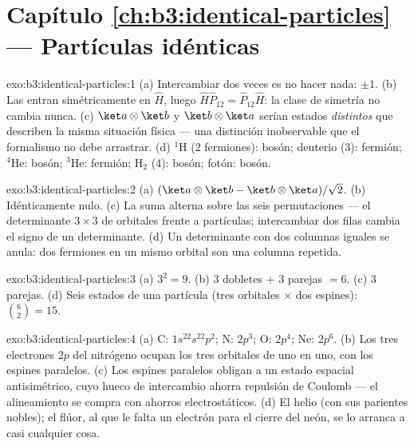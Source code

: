 \section*{Capítulo \ref{ch:b3:identical-particles} --- Partículas idénticas}

\begin{solution}{exo:b3:identical-particles:1}
(a) Intercambiar dos veces es no hacer nada:  $\pm1$. (b)
Las  entran simétricamente en $\hat H$, luego $\hat H\hat
P_{12} = \hat P_{12}\hat H$: la clase de simetría no cambia nunca. (c)
$\ket a\otimes\ket b$ y $\ket b\otimes\ket a$ serían estados
\emph{distintos} que describen la misma situación física ---
una distinción inobservable que el formalismo no debe arrastrar. (d)
$^1$H (2 fermiones): bosón; deuterio (3): fermión; $^4$He: bosón;
$^3$He: fermión; H$_2$ (4): bosón; fotón: bosón.
\end{solution}

\begin{solution}{exo:b3:identical-particles:2}
(a) $(\ket a\otimes\ket b - \ket b\otimes\ket a)/\sqrt2$. (b)
Idénticamente nulo. (c) La suma alterna sobre las seis
permutaciones --- el determinante $3\times3$ de orbitales frente a
partículas; intercambiar dos filas cambia el signo de un determinante. (d) Un
determinante con dos columnas iguales se anula: dos fermiones en un mismo
orbital son una columna repetida.
\end{solution}

\begin{solution}{exo:b3:identical-particles:3}
(a) $3^2 = 9$. (b) $3$ dobletes $+$ $3$ parejas $= 6$. (c) $3$ parejas.
(d) Seis estados de una partícula (tres orbitales $\times$ dos espines):
$\binom62 = 15$.
\end{solution}

\begin{solution}{exo:b3:identical-particles:4}
(a) C: $1s^22s^22p^2$; N: $2p^3$; O: $2p^4$; Ne: $2p^6$. (b)
Los tres electrones $2p$ del nitrógeno ocupan los tres orbitales de uno en
uno, con los espines paralelos. (c) Los espines paralelos obligan a un
estado espacial antisimétrico, cuyo hueco de intercambio ahorra repulsión de
Coulomb --- el alineamiento se compra con ahorros electrostáticos. (d) El
helio (con sus parientes nobles); el flúor, al que le falta un electrón para
el cierre del neón, se lo arranca a casi cualquier cosa.
\end{solution}

